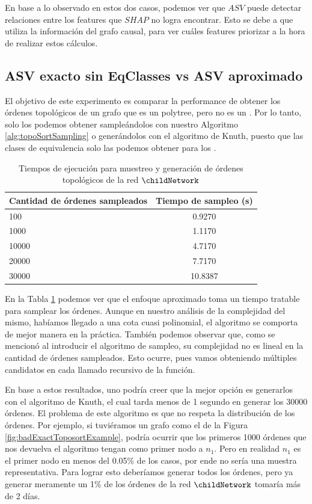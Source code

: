 En base a lo observado en estos dos casos, podemos ver que $ASV$ puede detectar relaciones entre los features que $SHAP$ no logra encontrar. Esto se debe a que utiliza la información del grafo causal, para ver cuáles features priorizar a la hora de realizar estos cálculos. 

\subsection{ASV exacto sin EqClasses vs ASV aproximado}

El objetivo de este experimento es comparar la performance de obtener los órdenes topológicos de un grafo que es un polytree, pero no es un \dtree. Por lo tanto, solo los podemos obtener sampleándolos con nuestro Algoritmo \ref{alg:topoSortSampling} o generándolos con el algoritmo de Knuth, puesto que las clases de equivalencia solo las podemos obtener para los \dtrees.

\begin{table}[h]
\centering
\begin{tabular}{|l|c|}
\hline
\textbf{Cantidad de órdenes sampleados} & \textbf{Tiempo de sampleo (s)}\\
    \hline
    100 & 0.9270 \\
    1000 & 1.1170 \\
    10000 & 4.7170 \\
    20000 & 7.7170 \\
    30000 & 10.8387 \\
    \hline
    \end{tabular}

\caption{Tiempos de ejecución para muestreo y generación de órdenes topológicos de la red $\childNetwork$}
\label{table:exactVsApproximateTopoSorts}
\end{table}

En la Tabla \ref{table:exactVsApproximateTopoSorts} podemos ver que el enfoque aproximado toma un tiempo tratable para samplear los órdenes. Aunque en nuestro análisis de la complejidad del mismo, habíamos llegado a una cota cuasi polinomial, el algoritmo se comporta de mejor manera en la práctica. También podemos observar que, como se mencionó al introducir el algoritmo de sampleo, su complejidad no es lineal en la cantidad de órdenes sampleados. Esto ocurre, pues vamos obteniendo múltiples candidatos en cada llamado recursivo de la función. 

En base a estos resultados, uno podría creer que la mejor opción es generarlos con el algoritmo de Knuth, el cual tarda menos de 1 segundo en generar los 30000 órdenes. El problema de este algoritmo es que no respeta la distribución de los órdenes.  Por ejemplo, si tuviéramos un grafo como el de la Figura \ref{fig:badExactToposortExample}, podría ocurrir que los primeros 1000 órdenes que nos devuelva el algoritmo tengan como primer nodo a $n_1$. Pero en realidad $n_1$ es el primer nodo en menos del 0.05\% de los casos, por ende no sería una muestra representativa. Para lograr esto deberíamos generar todos los órdenes, pero ya generar meramente un 1\% de los órdenes de la red $\childNetwork$ tomaría más de 2 días. 

